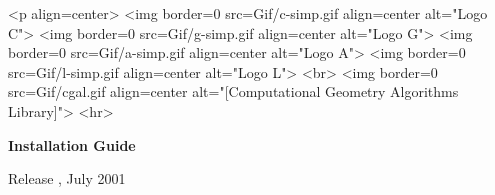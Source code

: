 
\pagestyle{empty}

\begin{titlepage}
  \mbox{} 
  \vspace{3cm}
  \ccTexHtml 
  {\centerline{
        }}
  {<p align=center>
    <img border=0 src=Gif/c-simp.gif align=center alt="Logo C">
    <img border=0 src=Gif/g-simp.gif align=center alt="Logo G">
    <img border=0 src=Gif/a-simp.gif align=center alt="Logo A">
    <img border=0 src=Gif/l-simp.gif align=center alt="Logo L">
    <br>
    <img border=0 src=Gif/cgal.gif align=center 
    alt="[Computational Geometry Algorithms Library]">
    <hr>}

  \vspace{2cm}
  \centerline{ {\huge{\bf Installation Guide}} }
  
  \vspace{2cm}
  \newcommand{\mydate}{July 2001}
  \ccTexHtml
  {\renewcommand{\mydate}{\ifcase\the\month \or January\or
      February\or March\or April\or May\or June\or July\or August\or
      September\or October\or November\or December\fi\ \the\year}}{}
  \centerline{ {\large Release \cgalrelease, \mydate} }
\end{titlepage}

%
\pagestyle{plain}
\setcounter{page}{0}
\cleardoublepage


